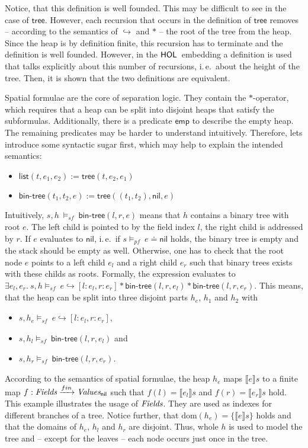 \documentclass{scrartcl}
\theoremstyle{definition}
\newcommand{\HOL}{{\sf HOL}}
\newcommand{\nil}{{\textsf{nil}}}
\newcommand{\pfequal}[2]{\ensuremath{#1 \doteq #2}}
\newcommand{\values}{{\emph{Values}}}
\newcommand{\valuesnil}{\ensuremath{\values_\nil}}
\newcommand{\fields}{{\emph{Fields}}}
\newcommand{\modelspf}{{\models_{\textit{pf}}\ }}
\newcommand{\modelssf}{{\models_{\textit{sf}}\ }}
\newcommand{\sfemp}{{\textsf{emp}}}
\newcommand{\sftree}{{\textsf{tree}}}
\newcommand{\sfpointsto}[2]{#1 \hookrightarrow [#2]}
\newcommand{\sfbintree}{{\textsf{bin-tree}}}
\newcommand{\sflist}{{\textsf{list}}}
\newcommand{\dom}{{\text{dom}}}
\newcommand{\tofin}{\xrightarrow{fin}}
\begin{document}
Notice, that this definition is well founded. This may be difficult to see in
the case of $\sftree$. However, each recursion that occurs in the definition
of $\sftree$ removes -- according to the semantics of $\hookrightarrow$ and
$*$ -- the root of the tree from the heap. Since the heap is by definition
finite, this recursion has to terminate and the definition is well founded.
However, in the $\HOL$\ embedding a definition is used that talks explicitly
about this number of recursions, i.\,e.\ about the height of the tree. Then, it
is shown that the two definitions are equivalent.
\bigskip

Spatial formulae are the core of separation logic. They contain the
$*$-operator, which requires that a heap can be split into disjoint heaps
that satisfy the subformulas. Additionally, there is a predicate $\sfemp$ to
describe the empty heap. The remaining predicates may be harder to understand
intuitively. Therefore, lets introduce some syntactic sugar first, which may
help to explain the intended semantics:

\begin{itemize}
\item $\sflist(t,e_1,e_2) := \sftree(t,e_2,e_1)$
\item $\sfbintree(t_1,t_2,e) := \sftree((t_1,t_2),\nil,e)$
\end{itemize}

Intuitively, $s, h\ \modelssf \sfbintree(l,r,e)$ means that $h$ contains a 
binary tree with root $e$. The left child is pointed to by the field
index $l$, the right child is addressed by $r$. If $e$ evaluates to $\nil$,
i.\,e.\ if $s \modelspf \pfequal e \nil$ holds, the binary tree is empty and
the stack should be empty as well. Otherwise, one has to check
that the root node $e$ points to a left child $e_l$ and a right child $e_r$ such that 
binary trees exists with these childs as roots. Formally, the expression evaluates to
$\exists e_l,e_r.\ s, h \modelssf \sfpointsto{e}{l:e_l, r:e_r} *
\sfbintree(l,r,e_l) * \sfbintree(l,r,e_r)$. This means, that the heap can be
split into three disjoint parts $h_e$, $h_1$ and $h_2$ with 
\begin{itemize}
  \item $s, h_e \modelssf \sfpointsto{e}{l:e_l, r:e_r}$,
  \item $s, h_l \modelssf \sfbintree(l,r,e_l)$ and
  \item $s, h_r \modelssf \sfbintree(l,r,e_r)$.
\end{itemize}
According to the semantics of spatial formulae, the heap $h_e$ maps $\llbracket e
\rrbracket s$ to a finite map $f:\fields \tofin \valuesnil$ such that
$f(l) = \llbracket e_l \rrbracket s$ and $f(r) = \llbracket e_r \rrbracket
s$ hold. This example illustrates the usage of $\fields$. They are used
as indexes for different branches of a tree. Notice further, that $\dom(h_e) =
\{\llbracket e \rrbracket s\}$ holds and that the domains of $h_e$, $h_l$ and $h_r$
are disjoint. Thus, whole $h$ is used to model the tree and -- except for the
leaves -- each node occurs just once in the tree. 
\end{document}
